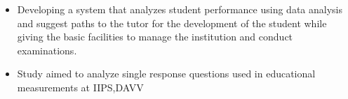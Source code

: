 \documentclass[10pt,a4paper]{altacv}
\begin{document}









\begin{itemize}
\item Developing a system that analyzes student performance using data analysis and suggest paths to the tutor for the development of the student while giving the basic facilities to manage the institution and conduct examinations.
\end{itemize}

\begin{itemize}
\item Study aimed to analyze single response questions used in educational measurements at IIPS,DAVV 
\end{itemize}

\end{document}
